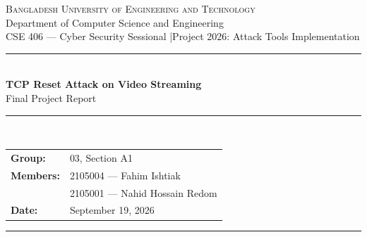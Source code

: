 \documentclass[11pt,a4paper]{article}
\begin{document}
\begin{center}
  {\large\scshape Bangladesh University of Engineering and Technology}\\[2pt]
  {\small Department of Computer Science and Engineering}\\[10pt]
  {\small CSE 406 — Cyber Security Sessional \quad|\quad Project 2026: Attack Tools Implementation}\\[16pt]
  \rule{\linewidth}{0.6pt}\\[6pt]
  {\LARGE\bfseries TCP Reset Attack on Video Streaming}\\[4pt]
  {\large Final Project Report}\\[4pt]
  \rule{\linewidth}{0.6pt}\\[12pt]

  \begin{tabular}{ll}
    \textbf{Group:} & 03, Section A1\\[4pt]
    \textbf{Members:} & 2105004 — Fahim Ishtiak\\
                      & 2105001 — Nahid Hossain Redom\\[4pt]
    \textbf{Date:} & September 19, 2026\\
  \end{tabular}
\end{center}
\vspace{6pt}
\hrule
\vspace{10pt}

\begin{abstract}
\noindent
This report documents the implementation and evaluation of a \textbf{TCP Reset
(RST) injection attack} against an active video-streaming session, together with
the defenses that stop it. TCP does not authenticate its control segments, so an
attacker who knows a connection's four-tuple and a valid sequence number can
forge an RST and tear the connection down. Because both switched LANs and Wi-Fi
deliver unicast frames only to their intended recipient, our attacker first uses
\textbf{ARP cache poisoning} to become a man-in-the-middle (MITM), reads the live
sequence numbers off the relayed stream, and injects a forged RST that stalls
playback. We report the attack process, the expected versus the actual outcome
(and the reasons they differ), the defense mechanisms and whether they behaved as
expected, and the assumptions underlying the whole demonstration. The attack and
both defense layers were demonstrated successfully on \textbf{three separate
physical machines} over a controlled Wi-Fi LAN.
\end{abstract}
\end{document}

